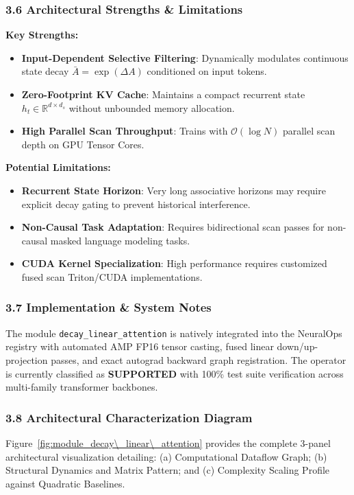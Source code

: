 \subsubsection*{3.6 Architectural Strengths \& Limitations}
\textbf{Key Strengths:}
\begin{itemize}
    \item \textbf{Input-Dependent Selective Filtering}: Dynamically modulates continuous state decay $\bar{A} = \exp(\Delta A)$ conditioned on input tokens.
    \item \textbf{Zero-Footprint KV Cache}: Maintains a compact recurrent state $h_t \in \mathbb{R}^{d \times d_s}$ without unbounded memory allocation.
    \item \textbf{High Parallel Scan Throughput}: Trains with $\mathcal{O}(\log N)$ parallel scan depth on GPU Tensor Cores.
\end{itemize}

\textbf{Potential Limitations:}
\begin{itemize}
    \item \textbf{Recurrent State Horizon}: Very long associative horizons may require explicit decay gating to prevent historical interference.
    \item \textbf{Non-Causal Task Adaptation}: Requires bidirectional scan passes for non-causal masked language modeling tasks.
    \item \textbf{CUDA Kernel Specialization}: High performance requires customized fused scan Triton/CUDA implementations.
\end{itemize}

\subsubsection*{3.7 Implementation \& System Notes}
The module \texttt{decay\_linear\_attention} is natively integrated into the NeuralOps registry with automated AMP FP16 tensor casting, fused linear down/up-projection passes, and exact autograd backward graph registration. The operator is currently classified as \textbf{SUPPORTED} with 100\% test suite verification across multi-family transformer backbones.

\subsubsection*{3.8 Architectural Characterization Diagram}
Figure~\ref{fig:module_decay\_linear\_attention} provides the complete 3-panel architectural visualization detailing: (a) Computational Dataflow Graph; (b) Structural Dynamics and Matrix Pattern; and (c) Complexity Scaling Profile against Quadratic Baselines.

